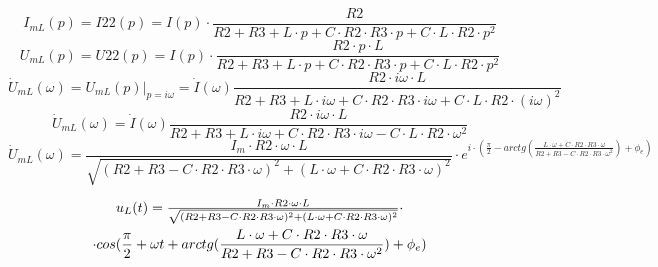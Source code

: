 \documentclass[a4paper,12pt]{article}
\begin{document}
$$I_{mL}(p)=I22(p)=I(p)\cdot \frac{R2}{R2+R3+L\cdot p+C\cdot R2\cdot R3\cdot p+C\cdot L\cdot R2\cdot p^2}$$
$$U_{mL}(p)=U22(p)=I(p)\cdot \frac{R2\cdot p\cdot L}{R2+R3+L\cdot p+C\cdot R2\cdot R3\cdot p+C\cdot L\cdot R2\cdot p^2}$$
$$\dot{U}_{mL}(\omega) = U_{mL}(p)\vert_{p=i\omega}=\dot{I}(\omega)\frac{R2\cdot i\omega\cdot L}{R2+R3+L\cdot {i\omega}+C\cdot R2\cdot R3\cdot {i\omega}+C\cdot L\cdot R2\cdot (i\omega)^2}$$
$$\dot{U}_{mL}(\omega) =\dot{I}(\omega)\frac{R2\cdot i\omega\cdot L}{R2+R3+L\cdot {i\omega}+C\cdot R2\cdot R3\cdot {i\omega}-C\cdot L\cdot R2\cdot \omega^2}$$
$$\dot{U}_{mL}(\omega) =\frac{I_m\cdot R2\cdot \omega\cdot L}{\sqrt{(R2+R3-C\cdot R2\cdot R3\cdot \omega)^2+(L\cdot \omega+C\cdot R2\cdot R3\cdot \omega)^2}}\cdot e^{i\cdot (\frac{\pi}{2}-arctg(\frac{L\cdot \omega+C\cdot R2\cdot R3\cdot \omega}{R2+R3-C\cdot R2\cdot R3\cdot \omega^2})+\phi_e)}$$

\begin{multline}
$$u_{L}(t) =\frac{I_m\cdot R2\cdot \omega\cdot L}{\sqrt{(R2+R3-C\cdot R2\cdot R3\cdot \omega)^2+(L\cdot \omega+C\cdot R2\cdot R3\cdot \omega)^2}}\cdot \\* \cdot cos(\frac{\pi}{2}+\omega t + arctg(\frac{L\cdot \omega+C\cdot R2\cdot R3\cdot \omega}{R2+R3-C\cdot R2\cdot R3\cdot \omega^2})+\phi_e)$$
\end{multline}
\end{document}
